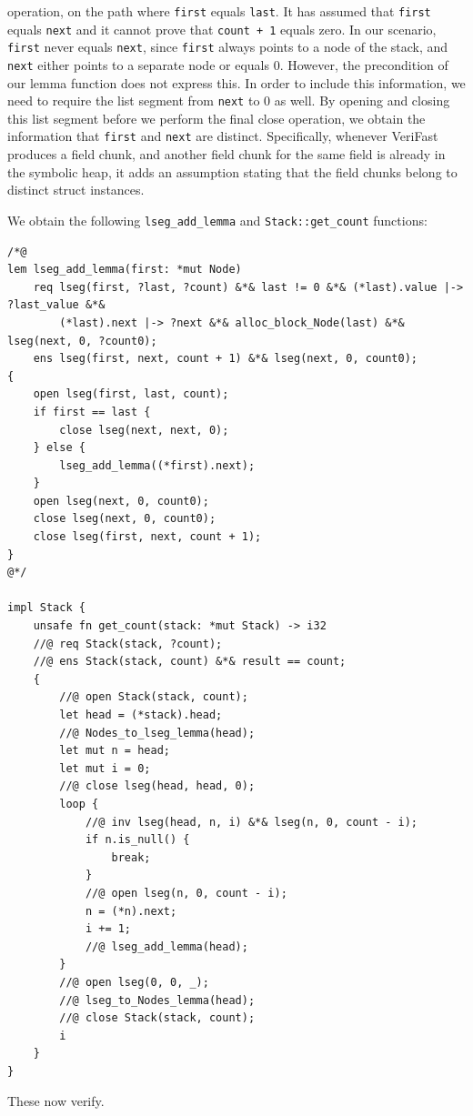 \documentclass{article}
\begin{document}
operation, on the path where \lstinline!first! equals
\lstinline!last!. It has assumed that \lstinline!first! equals
\lstinline!next! and it cannot prove that \lstinline!count + 1!
equals zero. In our scenario, \lstinline!first! never equals
\lstinline!next!, since \lstinline!first! always points to a
node of the stack, and \lstinline!next! either points to a
separate node or equals 0. However, the precondition of our
lemma function does not express this. In order to include this
information, we need to require the list segment from
\lstinline!next! to 0 as well. By opening and closing this list
segment before we perform the final close operation, we obtain
the information that \lstinline!first! and \lstinline!next! are
distinct. Specifically, whenever VeriFast produces a field
chunk, and another field chunk for the same field is already in
the symbolic heap, it adds an assumption stating that the field
chunks belong to distinct struct instances.

We obtain the following \lstinline!lseg_add_lemma! and
\lstinline!Stack::get_count! functions:
\begin{lstlisting}
/*@
lem lseg_add_lemma(first: *mut Node)
    req lseg(first, ?last, ?count) &*& last != 0 &*& (*last).value |-> ?last_value &*&
        (*last).next |-> ?next &*& alloc_block_Node(last) &*& lseg(next, 0, ?count0);
    ens lseg(first, next, count + 1) &*& lseg(next, 0, count0);
{
    open lseg(first, last, count);
    if first == last {
        close lseg(next, next, 0);
    } else {
        lseg_add_lemma((*first).next);
    }
    open lseg(next, 0, count0);
    close lseg(next, 0, count0);
    close lseg(first, next, count + 1);
}
@*/

impl Stack {
    unsafe fn get_count(stack: *mut Stack) -> i32
    //@ req Stack(stack, ?count);
    //@ ens Stack(stack, count) &*& result == count;
    {
        //@ open Stack(stack, count);
        let head = (*stack).head;
        //@ Nodes_to_lseg_lemma(head);
        let mut n = head;
        let mut i = 0;
        //@ close lseg(head, head, 0);
        loop {
            //@ inv lseg(head, n, i) &*& lseg(n, 0, count - i);
            if n.is_null() {
                break;
            }
            //@ open lseg(n, 0, count - i);
            n = (*n).next;
            i += 1;
            //@ lseg_add_lemma(head);
        }
        //@ open lseg(0, 0, _);
        //@ lseg_to_Nodes_lemma(head);
        //@ close Stack(stack, count);
        i
    }
}
\end{lstlisting}
These now verify.
\end{document}
